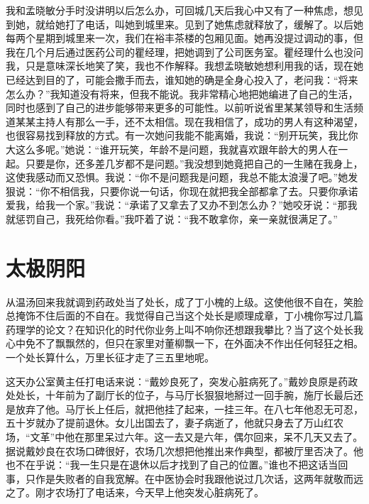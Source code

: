 \documentclass[12pt,oneside]{book}
\begin{document}
我和孟晓敏分手时没讲明以后怎么办，可回城几天后我心中又有了一种焦虑，想见到她，就给她打了电话，叫她到城里来。见到了她焦虑就释放了，缓解了。以后她每两个星期到城里来一次，我们在裕丰茶楼的包厢见面。她再没提过调动的事，但我在几个月后通过医药公司的瞿经理，把她调到了公司医务室。瞿经理什么也没问我，只是意味深长地笑了笑，我也不作解释。我想孟晓敏她想利用我的话，现在她已经达到目的了，可能会撒手而去，谁知她的确是全身心投入了，老问我：``将来怎么办？''我知道没有将来，但我不能说。我非常精心地把她编进了自己的生活，同时也感到了自己的进步能够带来更多的可能性。以前听说省里某某领导和生活频道某某主持人有那么一手，还不太相信。现在我相信了，成功的男人有这种渴望，也很容易找到释放的方式。有一次她问我能不能离婚，我说：``别开玩笑，我比你大这么多呢。''她说：``谁开玩笑，年龄不是问题，我就喜欢跟年龄大的男人在一起。只要是你，还多差几岁都不是问题。''我没想到她竟把自己的一生赌在我身上，这使我感动而又恐惧。我说：``你不是问题我是问题，我总不能太浪漫了吧。''她发狠说：``你不相信我，只要你说一句话，你现在就把我全部都拿了去。只要你承诺爱我，给我一个家。''我说：``承诺了又拿去了又办不到怎么办？''她咬牙说：``那我就惩罚自己，我死给你看。''我吓着了说：``我不敢拿你，亲一亲就很满足了。''


\chapter{太极阴阳}

从温汤回来我就调到药政处当了处长，成了丁小槐的上级。这使他很不自在，笑脸总掩饰不住后面的不自在。我觉得自己当这个处长是顺理成章，丁小槐你写过几篇药理学的论文？在知识化的时代你业务上叫不响你还想跟我攀比？当了这个处长我心中免不了飘飘然的，但只在家里对董柳飘一下，在外面决不作出任何轻狂之相。一个处长算什么，万里长征才走了三五里地呢。

这天办公室黄主任打电话来说：``戴妙良死了，突发心脏病死了。''戴妙良原是药政处处长，十年前为了副厅长的位子，与马厅长狠狠地掰过一回手腕，施厅长最后还是放弃了他。马厅长上任后，就把他挂了起来，一挂三年。在八七年他忍无可忍，五十岁就办了提前退休。女儿出国去了，妻子病逝了，他就只身去了万山红农场，``文革''中他在那里呆过六年。这一去又是六年，偶尔回来，呆不几天又去了。据说戴妙良在农场口碑很好，农场几次想把他推出来作典型，都被厅里否决了。他也不在乎说：``我一生只是在退休以后才找到了自己的位置。''谁也不把这话当回事，只作是失败者的自我宽解。在中医协会时我跟他说过几次话，这两年就敬而远之了。刚才农场打了电话来，今天早上他突发心脏病死了。
\end{document}
